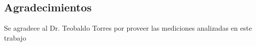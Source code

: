 \documentclass[aps,prl,reprint,superscriptaddress,showkeys]{revtex4-2}
\begin{document}



\subsection*{Agradecimientos} %
Se agradece al Dr. Teobaldo Torres por proveer las mediciones analizadas en este trabajo
    

\end{document}
